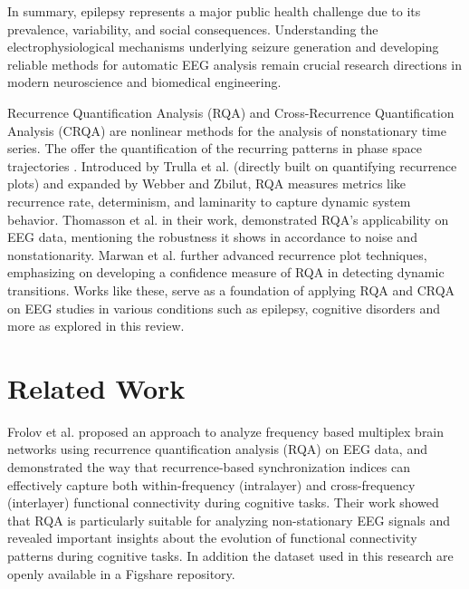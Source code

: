 \documentclass{article}
\begin{document}
	In summary, epilepsy represents a major public health challenge due to its prevalence, variability, and social consequences. Understanding the electrophysiological mechanisms underlying seizure generation and developing reliable methods for automatic EEG analysis remain crucial research directions in modern neuroscience and biomedical engineering.





			Recurrence Quantification Analysis (RQA) and Cross-Recurrence Quantification Analysis (CRQA) are
			nonlinear methods for the analysis of nonstationary time series.  %
			The offer the quantification of the recurring patterns in phase space trajectories \cite{trulla1996, webber2005}. 
			Introduced by Trulla et al.\cite{trulla1996} (directly built on quantifying recurrence plots\cite{eckmann1987}) 
			and expanded by Webber and Zbilut\cite{webber2005}, RQA measures metrics 
			like recurrence rate, determinism, and laminarity to capture dynamic system behavior. 
			Thomasson et al.\cite{thomasson2002} in their work, demonstrated RQA’s applicability on EEG data, mentioning 
			the robustness it shows in accordance to noise
			and nonstationarity. Marwan et al.\cite{marwan2013} further advanced recurrence plot techniques,
			emphasizing on developing a confidence measure of RQA in detecting dynamic transitions.
			Works like these, serve as a foundation of applying RQA and CRQA on EEG 
			studies in various conditions such as epilepsy, cognitive disorders and more 
			as explored in this review.
	\section{Related Work}
			Frolov et al.\cite{frolov} proposed an approach to analyze frequency based multiplex brain networks
			using recurrence quantification analysis (RQA) 
			on EEG data, and demonstrated the way that recurrence-based 
			synchronization indices can effectively capture 
			both within-frequency (intralayer) and cross-frequency (interlayer) 
			functional connectivity during cognitive tasks. 
			Their work showed that RQA is particularly suitable for analyzing 
			non-stationary EEG signals and revealed
			important insights about the evolution of functional connectivity 
			patterns during cognitive tasks. In addition the dataset
			used in this research are openly available in a Figshare repository.
\end{document}
